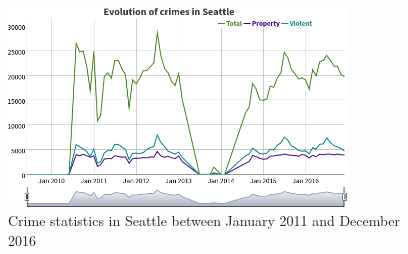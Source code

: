 \begin{figure}[H]
	\centering
	\includegraphics[width=0.8\textwidth]{images/single-seattle}
	\caption{Crime statistics in Seattle between January 2011 and December 2016}
	\label{fig:single-seattle}
\end{figure}
